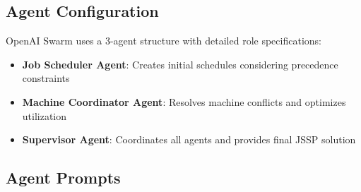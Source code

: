 \documentclass[11pt]{article}
\begin{document}
\subsection{Agent Configuration}

OpenAI Swarm uses a 3-agent structure with detailed role specifications:

\begin{itemize}
    \item \textbf{Job Scheduler Agent}: Creates initial schedules considering precedence constraints
    \item \textbf{Machine Coordinator Agent}: Resolves machine conflicts and optimizes utilization
    \item \textbf{Supervisor Agent}: Coordinates all agents and provides final JSSP solution
\end{itemize}

\subsection{Agent Prompts}
\end{document}
